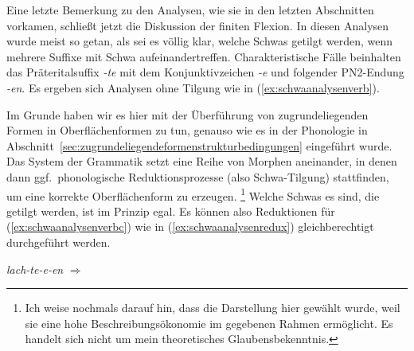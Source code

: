 
Eine letzte Bemerkung zu den Analysen, wie sie in den letzten Abschnitten vorkamen, schließt jetzt die Diskussion der finiten Flexion.
In diesen Analysen wurde meist so getan, als sei es völlig klar, welche Schwas getilgt werden, wenn mehrere Suffixe mit Schwa aufeinandertreffen.
Charakteristische Fälle beinhalten das Präteritalsuffix \textit{-te} mit dem Konjunktivzeichen \textit{-e} und folgender PN2-Endung \textit{-en}.
Es ergeben sich Analysen ohne Tilgung wie in (\ref{ex:schwaanalysenverb}).

\begin{exe}
  \ex\label{ex:schwaanalysenverb}
  \begin{xlist}
  \end{xlist}
\end{exe}

Im Grunde haben wir es hier mit der Überführung von zugrundeliegenden Formen in Oberflächenformen zu tun, genauso wie es in der Phonologie in Abschnitt~\ref{sec:zugrundeliegendeformenstrukturbedingungen} eingeführt wurde.
Das System der Grammatik setzt eine Reihe von Morphen aneinander, in denen dann ggf.\ phonologische Reduktionsprozesse (also Schwa-Tilgung) stattfinden, um eine korrekte Oberflächenform zu erzeugen.%
\footnote{Ich weise nochmals darauf hin, dass die Darstellung hier gewählt wurde, weil sie eine hohe Beschreibungsökonomie im gegebenen Rahmen ermöglicht.
Es handelt sich nicht um mein theoretisches Glaubensbekenntnis.}
Welche Schwas es sind, die getilgt werden, ist im Prinzip egal.
Es können also Reduktionen für (\ref{ex:schwaanalysenverbc}) wie in (\ref{ex:schwaanalysenredux}) gleichberechtigt durchgeführt werden.

\begin{exe}
  \ex\label{ex:schwaanalysenredux} \textit{lach-te-e-en} $\Rightarrow$
  \begin{xlist}
  \end{xlist}
\end{exe}


